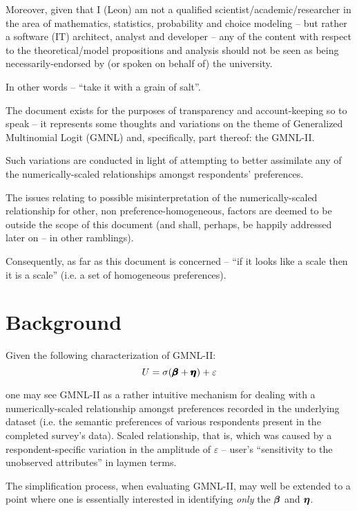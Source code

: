 \documentclass[12pt,a4paper]{article}
\begin{document}
Moreover, given that I (Leon) am not a qualified scientist/academic/researcher in the area of mathematics, statistics, probability and choice modeling -- but rather a software (IT) architect, analyst and developer -- any of the content with respect to the theoretical/model propositions and analysis should not be seen as being necessarily-endorsed by (or spoken on behalf of) the university. 

In other words -- ``take it with a grain of salt''.

The document exists for the purposes of transparency and account-keeping so to speak -- it represents some thoughts and variations on the theme of Generalized Multinomial Logit (GMNL) and, specifically, part thereof: the GMNL-II. 

Such variations are conducted in light of attempting to better assimilate any of the numerically-scaled relationships amongst respondents' preferences.

The issues relating to possible misinterpretation of the numerically-scaled relationship for other, non preference-homogeneous, factors are deemed to be outside the scope of this document (and shall, perhaps, be happily addressed later on -- in other ramblings). 

Consequently, as far as this document is concerned -- ``if it looks like a scale then it is a scale'' (i.e. a set of homogeneous preferences).

\section{Background}

Given the following characterization of GMNL-II:
{ \Large 
\begin{equation}
\label{eq:gmnl_2a_1}
U=\sigma(\pmb{\hm{\beta}}+\pmb{\hm{\eta}}) + \varepsilon
\end{equation}
}

one may see GMNL-II as a rather intuitive mechanism for dealing with a numerically-scaled relationship amongst preferences recorded in the underlying dataset (i.e. the semantic preferences of various respondents present in the completed survey's data). Scaled relationship, that is, which was caused by a respondent-specific variation in the amplitude of  \(\varepsilon\) -- user's ``sensitivity to the unobserved attributes'' in laymen terms.

The simplification process, when evaluating GMNL-II, may well be extended to a point where one is essentially interested in identifying \textit{only} the \(\hm{\beta}\) and \(\hm{\eta}\). 
\end{document}
